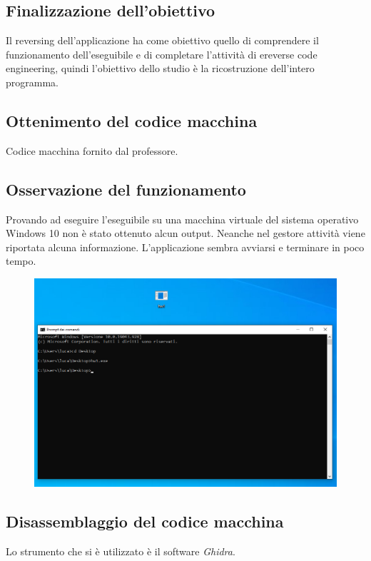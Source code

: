 \documentclass[a4paper, 12pt]{article}
\begin{document}
\subsection{Finalizzazione dell'obiettivo}
Il reversing dell'applicazione ha come obiettivo quello di comprendere il funzionamento dell'eseguibile e di completare l'attività di e{reverse code engineering}, quindi l'obiettivo dello studio è la ricostruzione dell'intero programma.

\subsection{Ottenimento del codice macchina}
Codice macchina fornito dal professore.


\subsection{Osservazione del funzionamento}
Provando ad eseguire l'eseguibile su una macchina virtuale del sistema operativo Windows 10 non è stato ottenuto alcun output. Neanche nel gestore attività viene riportata alcuna informazione. L'applicazione sembra avviarsi e terminare in poco tempo.\newline

\begin{figure}[H]
\centering\includegraphics[width=\textwidth]{esecution}
\end{figure}

\subsection{Disassemblaggio del codice macchina}
Lo strumento che si è utilizzato è il software \emph{Ghidra}.
\end{document}
